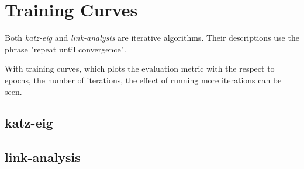 
\section{Training Curves}\label{sec:graphs:training_curves}

Both \textit{katz-eig} and \textit{link-analysis} are iterative algorithms. Their descriptions use the phrase "repeat until convergence".

With training curves, which plots the evaluation metric with the respect to epochs, the number of iterations, the effect of running more iterations can be seen.


\subsection{katz-eig}









\subsection{link-analysis}




